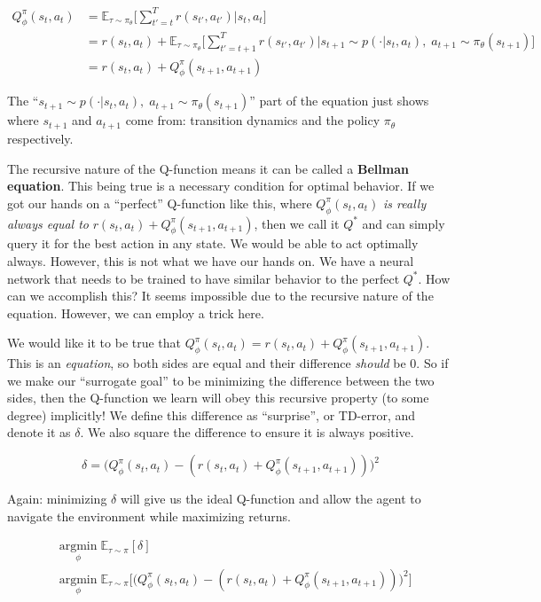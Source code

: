     \begin{align*}
        Q_\phi^\pi(s_t, a_t) &= \mathbb{E}_{\tau \sim \pi_\theta} \biggl[\sum_{t' = t}^T r(s_{t'}, a_{t'}) | s_t, a_t\biggr]\\
        & = r(s_t, a_t) + \mathbb{E}_{\tau \sim \pi_\theta} \biggl[\sum_{t' = t+1}^T r(s_{t'}, a_{t'}) | s_{t+1} \sim p(\cdot|s_t,a_t),\;a_{t+1} \sim \pi_\theta(s_{t+1}) \biggr]\\
        & = r(s_t, a_t) + Q_\phi^\pi(s_{t+1}, a_{t+1})
    \end{align*}
    
    The ``$ s_{t+1} \sim p(\cdot|s_t,a_t),\;a_{t+1} \sim \pi_\theta(s_{t+1})$'' part of the equation just shows where $s_{t+1}$ and $a_{t+1}$ come from: transition dynamics and the policy $\pi_\theta$ respectively. 
    
    The recursive nature of the Q-function means it can be called a \textbf{Bellman equation}. This being true is a necessary condition for optimal behavior. If we got our hands on a ``perfect'' Q-function like this, where $Q_\phi^\pi(s_t, a_t)$ \textit{is really always equal to} $r(s_t, a_t) + Q_\phi^\pi(s_{t+1}, a_{t+1})$, then we call it $Q^\ast$ and can simply query it for the best action in any state. We would be able to act optimally always. However, this is not what we have our hands on. We have a neural network that needs to be trained to have similar behavior to the perfect $Q^\ast$. How can we accomplish this? It seems impossible due to the recursive nature of the equation. However, we can employ a trick here. 
    
    We would like it to be true that $Q_\phi^\pi(s_t, a_t) = r(s_t, a_t) + Q_\phi^\pi(s_{t+1}, a_{t+1})$. This is an \textit{equation}, so both sides are equal and their difference \textit{should} be 0. So if we make our ``surrogate goal'' to be minimizing the difference between the two sides, then the Q-function we learn will obey this recursive property (to some degree) implicitly! We define this difference as ``surprise'', or TD-error, and denote it as $\delta$. We also square the difference to ensure it is always positive. 
    
    $$\delta = \biggl(Q_\phi^\pi(s_t, a_t) - (r(s_t, a_t) + Q_\phi^\pi(s_{t+1}, a_{t+1}))\biggr)^2$$
    
    Again: minimizing $\delta$ will give us the ideal Q-function and allow the agent to navigate the environment while maximizing returns.
    
    \begin{align*}
        & \underset{\phi}{\mathrm{argmin}}\;\mathbb{E}_{\tau \sim \pi}[\delta]\\
        & \underset{\phi}{\mathrm{argmin}}\;\mathbb{E}_{\tau \sim \pi}\biggl[\biggl(Q_\phi^\pi(s_t, a_t) - (r(s_t, a_t) + Q_\phi^\pi(s_{t+1}, a_{t+1}))\biggr)^2\biggr]
    \end{align*}
    
